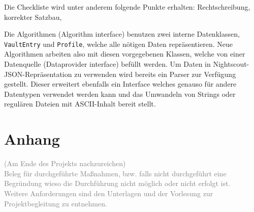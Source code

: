 \documentclass[accentcolor=tud0b,12pt,paper=a4]{tudreport}
\begin{document}
Die Checkliste wird unter anderem folgende Punkte erhalten: Rechtschreibung, korrekter Satzbau, 

Die Algorithmen (Algorithm interface) benutzen zwei interne Datenklassen, \texttt{VaultEntry} und \texttt{Profile}, welche alle nötigen Daten repräsentieren. Neue Algorithmen arbeiten also mit diesen vorgegebenen Klassen, welche von einer Datenquelle (Dataprovider interface) befüllt werden. Um Daten in Nightscout-JSON-Repräsentation zu verwenden wird bereits ein Parser zur Verfügung gestellt. Dieser erweitert ebenfalls ein Interface welches genauso für andere Datentypen verwendet werden kann und das Umwandeln von Strings oder regulären Dateien mit ASCII-Inhalt bereit stellt.


	        
	
\appendix	
	\chapter{Anhang}
		
		\textcolor{gray}{(Am Ende des Projekts nachzureichen)}\\
		
		\textcolor{gray}{Beleg für durchgeführte Maßnahmen, bzw. falls nicht durchgeführt eine Begründung wieso die Durchführung nicht möglich oder nicht erfolgt ist. \\
		Weitere Anforderungen sind den Unterlagen und der Vorlesung zur Projektbegleitung zu entnehmen.}
	
\end{document}
